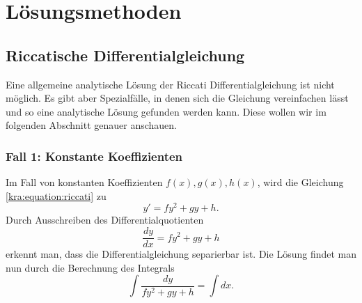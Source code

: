 \section{Lösungsmethoden} \label{kra:section:loesung}

\subsection{Riccatische Differentialgleichung} \label{kra:loesung:riccati}
Eine allgemeine analytische Lösung der Riccati Differentialgleichung ist nicht möglich.
Es gibt aber Spezialfälle, in denen sich die Gleichung vereinfachen lässt und so eine analytische Lösung gefunden werden kann.
Diese wollen wir im folgenden Abschnitt genauer anschauen.

\subsubsection{Fall 1: Konstante Koeffizienten}
Im Fall von konstanten Koeffizienten $f(x), g(x), h(x)$, wird die Gleichung \eqref{kra:equation:riccati} zu
\begin{equation}
    y' = fy^2 + gy + h.
\end{equation}
Durch Ausschreiben des Differentialquotienten
\begin{equation}
    \frac{dy}{dx} = fy^2 + gy + h
\end{equation}
erkennt man, dass die Differentialgleichung separierbar ist. Die Lösung findet man nun durch die Berechnung des Integrals
\begin{equation} \label{kra:equation:case1_int}
    \int \frac{dy}{fy^2 + gy + h} = \int dx.
\end{equation}

